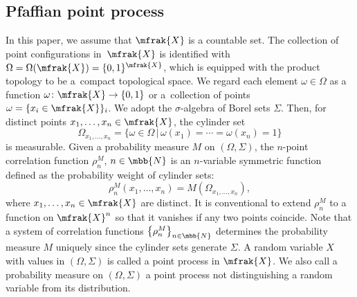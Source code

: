 \subsection{Pfaffian point process}
In this paper, we assume that $\mfrak{X}$ is a countable set. The collection of point configurations in~$\mfrak{X}$ is identified with $\Omega=\Omega (\mfrak{X})=\{0,1\}^{\mfrak{X}}$, which is equipped with the product topology to be a~compact topological space. We regard each element $\omega\in \Omega$ as a function $\omega\colon \mfrak{X}\to\{0,1\}$ or a~collection of points $\omega=\{x_{i}\in\mfrak{X}\}_{i}$. We adopt the $\sigma$-algebra of Borel sets $\Sigma$. Then, for distinct points $x_{1},\dots, x_{n}\in \mfrak{X}$, the cylinder set
\begin{equation*}
	\Omega_{x_{1},\dots, x_{n}}=\{\omega\in\Omega\,|\,\omega (x_{1})=\cdots =\omega (x_{n})=1\}
\end{equation*}
is measurable.
Given a probability measure $M$ on $(\Omega,\Sigma)$, the $n$-point correlation function $\rho^{M}_{n}$, $n\in\mbb{N}$ is an $n$-variable symmetric function defined as the probability weight of cylinder sets:
\begin{equation*}
	\rho^{M}_{n}(x_{1},\dots, x_{n})=M(\Omega_{x_{1},\dots, x_{n}}),
\end{equation*}
where $x_{1},\dots, x_{n}\in \mfrak{X}$ are distinct. It is conventional to extend $\rho^{M}_{n}$ to a function on $\mfrak{X}^{n}$ so that it vanishes if any two points coincide.
Note that a system of correlation functions $\big\{\rho^{M}_{n}\big\}_{n\in\mbb{N}}$ determines the probability measure $M$ uniquely since the cylinder sets generate $\Sigma$.
A random variable $X$ with values in $(\Omega,\Sigma)$ is called a point process in $\mfrak{X}$. We also call a probability measure on $(\Omega,\Sigma)$ a point process not distinguishing a random variable from its distribution.

